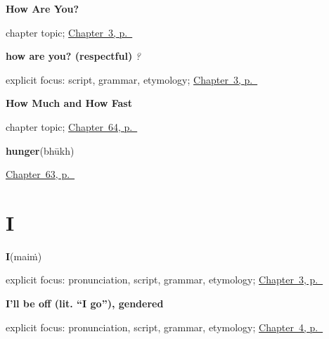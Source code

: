\noindent\begin{minipage}[t]{\linewidth}
\raggedright
\textbf{How Are You?}\par
\footnotesize chapter topic; \hyperref[ch:responding]{Chapter~3, p.~\pageref*{ch:responding}}
\end{minipage}\par\smallskip

\noindent\begin{minipage}[t]{\linewidth}
\raggedright
\textbf{how are you? (respectful)}\enspace\emph{  ?}\par
\footnotesize explicit focus: script, grammar, etymology; \hyperref[ch:responding]{Chapter~3, p.~\pageref*{ch:responding}}
\end{minipage}\par\smallskip

\noindent\begin{minipage}[t]{\linewidth}
\raggedright
\textbf{How Much and How Fast}\par
\footnotesize chapter topic; \hyperref[ch:hi-how-much-and-how-fast]{Chapter~64, p.~\pageref*{ch:hi-how-much-and-how-fast}}
\end{minipage}\par\smallskip

\noindent\begin{minipage}[t]{\linewidth}
\raggedright
\textbf{hunger}\enspace\emph{}\enspace(bhūkh)\par
\footnotesize \hyperref[ch:hi-what-the-body-tells-you]{Chapter~63, p.~\pageref*{ch:hi-what-the-body-tells-you}}
\end{minipage}\par\smallskip

\section*{I}

\noindent\begin{minipage}[t]{\linewidth}
\raggedright
\textbf{I}\enspace\emph{}\enspace(maiṁ)\par
\footnotesize explicit focus: pronunciation, script, grammar, etymology; \hyperref[ch:responding]{Chapter~3, p.~\pageref*{ch:responding}}
\end{minipage}\par\smallskip

\noindent\begin{minipage}[t]{\linewidth}
\raggedright
\textbf{I'll be off (lit. \textquotedblleft{}I go\textquotedblright{}), gendered}\enspace\emph{ }\par
\footnotesize explicit focus: pronunciation, script, grammar, etymology; \hyperref[ch:farewells]{Chapter~4, p.~\pageref*{ch:farewells}}
\end{minipage}\par\smallskip

